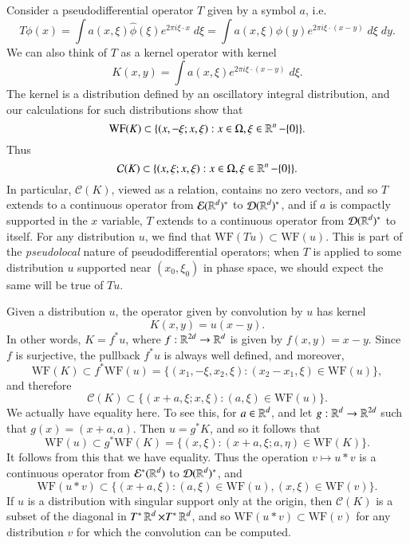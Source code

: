 \begin{example}
    Consider a pseudodifferential operator $T$ given by a symbol $a$, i.e.
    \[ T\phi(x) = \int a(x,\xi) \widehat{\phi}(\xi) e^{2 \pi i \xi \cdot x}\; d\xi = \int a(x,\xi) \phi(y) e^{2 \pi i \xi \cdot (x - y)}\; d\xi\; dy. \]
    We can also think of $T$ as a kernel operator with kernel
    \[ K(x,y) = \int a(x,\xi) e^{2 \pi i \xi \cdot (x - y)} \; d\xi. \]
    The kernel is a distribution defined by an oscillatory integral distribution, and our calculations for such distributions show that
    \[ \text{WF}(K) \subset \{ (x,-\xi;x,\xi) : x \in \Omega, \xi \in \operatorname{\mathbb{R}}^n - \{ 0 \} \}. \]
    Thus
    \[ \mathcal{C}(K) \subset \{ (x,\xi;x,\xi) : x \in \Omega, \xi \in \operatorname{\mathbb{R}}^n - \{ 0 \} \}. \]
    In particular, $\mathcal{C}(K)$, viewed as a relation, contains no zero vectors, and so $T$ extends to a continuous operator from $\mathcal{E}(\operatorname{\mathbb{R}}^d)^*$ to $\operatorname{\mathcal{D}}(\operatorname{\mathbb{R}}^d)^*$, and if $a$ is compactly supported in the $x$ variable, $T$ extends to a continuous operator from $\operatorname{\mathcal{D}}(\operatorname{\mathbb{R}}^d)^*$ to itself. For any distribution $u$, we find that $\text{WF}(Tu) \subset \text{WF}(u)$. This is part of the \emph{pseudolocal} nature of pseudodifferential operators; when $T$ is applied to some distribution $u$ supported near $(x_0,\xi_0)$ in phase space, we should expect the same will be true of $Tu$.
\end{example}

\begin{example}
    Given a distribution $u$, the operator given by convolution by $u$ has kernel
    \[ K(x,y) = u(x-y). \]
    In other words, $K = f^* u$, where $f: \operatorname{\mathbb{R}}^{2d} \to \operatorname{\mathbb{R}}^d$ is given by $f(x,y) = x - y$. Since $f$ is surjective, the pullback $f^* u$ is always well defined, and moreover,
    \[ \text{WF}(K) \subset f^* \text{WF}(u) = \{ (x_1,-\xi,x_2,\xi): (x_2 - x_1, \xi) \in \text{WF}(u) \}, \]     
    and therefore
    \[ \mathcal{C}(K) \subset \{ (x+a,\xi;x,\xi): (a,\xi) \in \text{WF}(u) \}. \]
    We actually have equality here. To see this, for $a \in \operatorname{\mathbb{R}}^d$, and let $g: \operatorname{\mathbb{R}}^d \to \operatorname{\mathbb{R}}^{2d}$ such that $g(x) = (x + a, a)$. Then $u = g^* K$, and so it follows that
    \[ \text{WF}(u) \subset g^* \text{WF}(K) = \{ (x,\xi): (x+a, \xi; a, \eta) \in \text{WF}(K) \}. \]
    It follows from this that we have equality. Thus the operation $v \mapsto u * v$ is a continuous operator from $\mathcal{E}^*(\operatorname{\mathbb{R}}^d)$ to $\operatorname{\mathcal{D}}(\operatorname{\mathbb{R}}^d)^*$, and
    \[ \text{WF}(u * v) \subset \{ (x+a,\xi): (a,\xi) \in \text{WF}(u), (x,\xi) \in \text{WF}(v) \}. \]
    If $u$ is a distribution with singular support only at the origin, then $\mathcal{C}(K)$ is a subset of the diagonal in $T^* \operatorname{\mathbb{R}}^d \times T^* \operatorname{\mathbb{R}}^d$, and so $\text{WF}(u * v) \subset \text{WF}(v)$ for any distribution $v$ for which the convolution can be computed.
\end{example}

